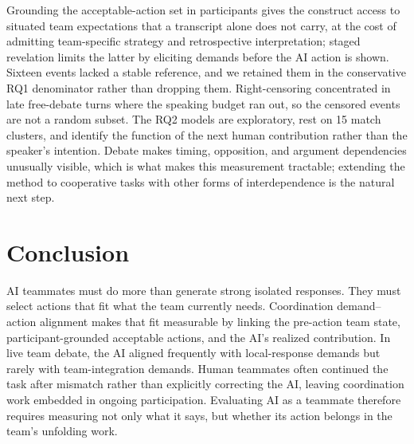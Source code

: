 \documentclass[manuscript,review,anonymous]{acmart}
\begin{document}
Grounding the acceptable-action set in participants gives the construct access to situated team expectations that a transcript alone does not carry, at the cost of admitting team-specific strategy and retrospective interpretation; staged revelation limits the latter by eliciting demands before the AI action is shown. Sixteen events lacked a stable reference, and we retained them in the conservative RQ1 denominator rather than dropping them. Right-censoring concentrated in late free-debate turns where the speaking budget ran out, so the censored events are not a random subset. The RQ2 models are exploratory, rest on 15 match clusters, and identify the function of the next human contribution rather than the speaker's intention. Debate makes timing, opposition, and argument dependencies unusually visible, which is what makes this measurement tractable; extending the method to cooperative tasks with other forms of interdependence is the natural next step.

\section{Conclusion}

AI teammates must do more than generate strong isolated responses. They must select actions that fit what the team currently needs. Coordination demand--action alignment makes that fit measurable by linking the pre-action team state, participant-grounded acceptable actions, and the AI's realized contribution. In live team debate, the AI aligned frequently with local-response demands but rarely with team-integration demands. Human teammates often continued the task after mismatch rather than explicitly correcting the AI, leaving coordination work embedded in ongoing participation. Evaluating AI as a teammate therefore requires measuring not only what it says, but whether its action belongs in the team's unfolding work.
\end{document}
